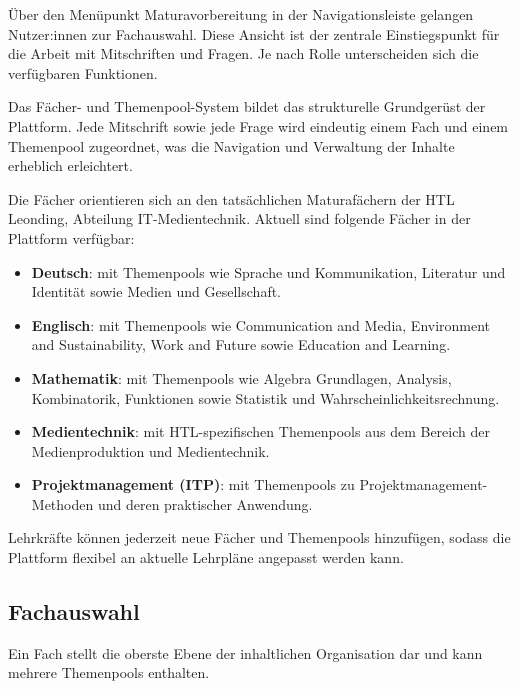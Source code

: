 \setauthor{\secondauthor}
\label{sec:maturaupload-faecher-themenpools}

Über den Menüpunkt \glqq Maturavorbereitung\grqq{} in der Navigationsleiste gelangen 
Nutzer:innen zur Fachauswahl. Diese Ansicht ist der zentrale Einstiegspunkt 
für die Arbeit mit Mitschriften und Fragen. Je nach Rolle unterscheiden sich 
die verfügbaren Funktionen.

Das Fächer- und Themenpool-System bildet das strukturelle Grundgerüst der 
Plattform. Jede Mitschrift sowie jede Frage wird eindeutig einem Fach und 
einem Themenpool zugeordnet, was die Navigation und Verwaltung der Inhalte 
erheblich erleichtert.

Die Fächer orientieren sich an den tatsächlichen Maturafächern der HTL 
Leonding, Abteilung IT-Medientechnik. Aktuell sind folgende Fächer in 
der Plattform verfügbar:

\begin{itemize}
    \item \textbf{Deutsch}: mit Themenpools wie Sprache und Kommunikation, 
    Literatur und Identität sowie Medien und Gesellschaft.
    
    \item \textbf{Englisch}: mit Themenpools wie Communication and Media, 
    Environment and Sustainability, Work and Future sowie Education and 
    Learning.
    
    \item \textbf{Mathematik}: mit Themenpools wie Algebra Grundlagen, 
    Analysis, Kombinatorik, Funktionen sowie Statistik und 
    Wahrscheinlichkeitsrechnung.
    
    \item \textbf{Medientechnik}: mit HTL-spezifischen Themenpools aus 
    dem Bereich der Medienproduktion und Medientechnik.
    
    \item \textbf{Projektmanagement (ITP)}: mit Themenpools zu 
    Projektmanagement-Methoden und deren praktischer Anwendung.
\end{itemize}

Lehrkräfte können jederzeit neue Fächer und Themenpools hinzufügen, 
sodass die Plattform flexibel an aktuelle Lehrpläne angepasst 
werden kann.

\subsection{Fachauswahl}

Ein Fach stellt die oberste Ebene der inhaltlichen Organisation dar und 
kann mehrere Themenpools enthalten.


